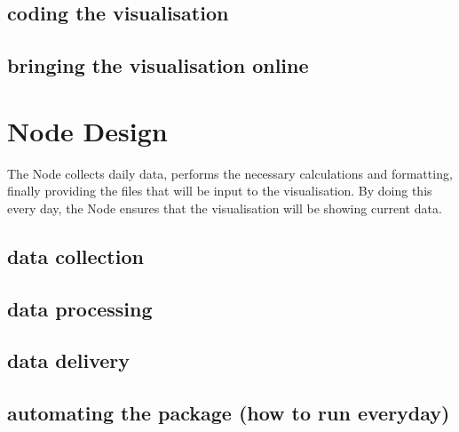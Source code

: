 \documentclass[10pt, a4paper]{article}
\begin{document}
\begin{multicols}{2}
\subsection{coding the visualisation}


\subsection{bringing the visualisation online}


\section{Node Design}

The Node collects daily data, performs the necessary calculations and formatting, finally providing the files that will be input to the visualisation. By doing this every day, the Node ensures that the visualisation will be showing current data.

\subsection{data collection}
\subsection{data processing}
\subsection{data delivery}
\subsection{automating the package (how to run everyday)}




\end{multicols}
\end{document}
